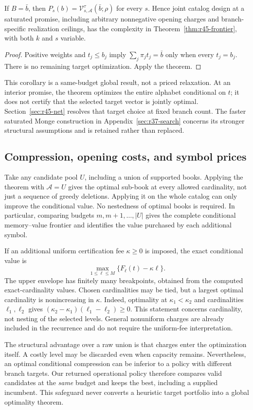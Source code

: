 \begin{corollary}\label{cor:r45-saturated}
If $B=\bar b$, then $P_s(b)=\mathcal V_{s,\mathcal A}^{\tau}(\bar b;\rho)$ for every $s$. Hence joint catalog design at a saturated promise, including arbitrary nonnegative opening charges and branch-specific realization ceilings, has the complexity in Theorem~\ref{thm:r45-frontier}, with both $k$ and $s$ variable.
\end{corollary}
\begin{proof}
Positive weights and $t_j\leq b_j$ imply $\sum_j\pi_jt_j=\bar b$ only when every $t_j=b_j$. There is no remaining target optimization. Apply the theorem.
\end{proof}

This corollary is a same-budget global result, not a priced relaxation. At an interior promise, the theorem optimizes the entire alphabet conditional on $t$; it does not certify that the selected target vector is jointly optimal. Section~\ref{sec:r45-net} resolves that target choice at fixed branch count. The faster saturated Monge construction in Appendix~\ref{sec:r37-search} concerns its stronger structural assumptions and is retained rather than replaced.

\subsection{Compression, opening costs, and symbol prices}
Take any candidate pool $U$, including a union of supported books. Applying the theorem with $\mathcal A=U$ gives the optimal sub-book at every allowed cardinality, not just a sequence of greedy deletions. Applying it on the whole catalog can only improve the conditional value. No nestedness of optimal books is required. In particular, comparing budgets $m,m+1,\ldots,|U|$ gives the complete conditional memory--value frontier and identifies the value purchased by each additional symbol.

If an additional uniform certification fee $\kappa\geq0$ is imposed, the exact conditional value is
\begin{equation}\label{eq:r45-surcharge}
 \max_{1\leq\ell\leq M}\{F_\ell(t)-\kappa\ell\}.
\end{equation}
The upper envelope has finitely many breakpoints, obtained from the computed exact-cardinality values. Chosen cardinalities may be tied, but a largest optimal cardinality is nonincreasing in $\kappa$. Indeed, optimality at $\kappa_1<\kappa_2$ and cardinalities $\ell_1,\ell_2$ gives $(\kappa_2-\kappa_1)(\ell_1-\ell_2)\geq0$. This statement concerns cardinality, not nesting of the selected levels. General nonuniform charges are already included in the recurrence and do not require the uniform-fee interpretation.

The structural advantage over a raw union is that charges enter the optimization itself. A costly level may be discarded even when capacity remains. Nevertheless, an optimal conditional compression can be inferior to a policy with different branch targets. Our returned operational policy therefore compares valid candidates at the \emph{same} budget and keeps the best, including a supplied incumbent. This safeguard never converts a heuristic target portfolio into a global optimality theorem.

